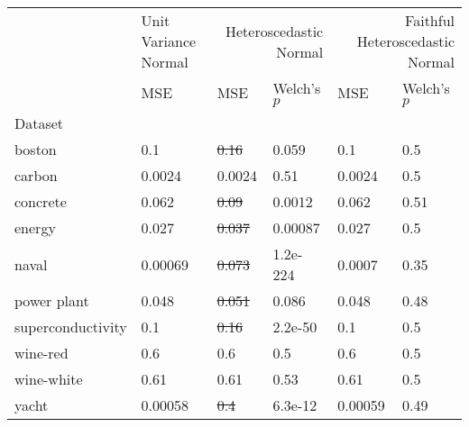 \begin{tabular}{l|l|ll|ll}
\toprule
 & Unit Variance Normal & \multicolumn{2}{r}{Heteroscedastic Normal} & \multicolumn{2}{r}{Faithful Heteroscedastic Normal} \\
 & MSE & MSE & Welch's $p$ & MSE & Welch's $p$ \\
Dataset &  &  &  &  &  \\
\midrule
boston & 0.1 & \sout{0.16} & 0.059 & 0.1 & 0.5 \\
carbon & 0.0024 & 0.0024 & 0.51 & 0.0024 & 0.5 \\
concrete & 0.062 & \sout{0.09} & 0.0012 & 0.062 & 0.51 \\
energy & 0.027 & \sout{0.037} & 0.00087 & 0.027 & 0.5 \\
naval & 0.00069 & \sout{0.073} & 1.2e-224 & 0.0007 & 0.35 \\
power plant & 0.048 & \sout{0.051} & 0.086 & 0.048 & 0.48 \\
superconductivity & 0.1 & \sout{0.16} & 2.2e-50 & 0.1 & 0.5 \\
wine-red & 0.6 & 0.6 & 0.5 & 0.6 & 0.5 \\
wine-white & 0.61 & 0.61 & 0.53 & 0.61 & 0.5 \\
yacht & 0.00058 & \sout{0.4} & 6.3e-12 & 0.00059 & 0.49 \\
\bottomrule
\end{tabular}
